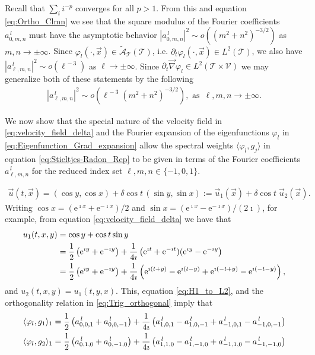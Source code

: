 \documentclass[11pt]{amsart}
\newcommand{\e}{\mathrm{e}}
\newcommand{\Tc}{\mathcal{T}}
\newcommand{\Vc}{\mathcal{V}}
\newcommand{\As}{\mathscr{A}}
\begin{document}
Recall that $\sum_ii^{-p}$ converges for all $p>1$. From this and
equation \eqref{eq:Ortho_Clmn} we see that the square modulus of the  
Fourier coefficients $a^{\,l}_{0,m,n}$ must have the asymptotic behavior 
$|a^{\,l}_{0,m,n}|^2\sim o((m^2+n^2)^{-3/2})$ as $m,n\to\pm\infty$. Since
$\varphi_l(\cdot,\vec{x})\in\tilde{\As}_{\Tc}(\Tc)$, i.e. $\partial_t\varphi_l(\cdot,\vec{x})\in L^2(\Tc)$, we also
have $|a^{\,l}_{\ell,m,n}|^2\sim o(\ell^{\,-3})$ as $\ell\to\pm\infty$. Since
$\partial_t\vec{\nabla}\varphi_l\in L^2(\Tc\times\Vc)$ we may generalize 
both of these statements by the following
%
\begin{align}\label{eq:Clmn_assymptotics}
  |a^{\,l}_{\ell,m,n}|^2\sim o(\ell^{\,-3}(m^2+n^2)^{-3/2}), \text{ as } \,\ell,m,n\to\pm\infty.
\end{align}
%





We now show that the special nature of the velocity field in
\eqref{eq:velocity_field_delta} and the Fourier expansion of the eigenfunctions $\varphi_l$ in  
\eqref{eq:Eigenfunction_Grad_expansion} allow the spectral weights
$\langle\varphi_l,g_j\rangle$ in equation \eqref{eq:Stieltjes-Radon_Rep} to be given in
terms of the Fourier coefficients $a^{\,l}_{\ell,m,n}$ for the reduced
index set $\ell,m,n\in\{-1,0,1\}$. 


%
\begin{align}\label{eq:velocity_field_delta}
\vec{u}(t,\vec{x})%
       =(\cos y,\cos x)+\delta\cos t \,(\sin y,\sin x)
       :=\vec{u}_1(\vec{x})+\delta\cos{t}\;\vec{u}_2(\vec{x}). 
\end{align}
%
Writing
$\cos{x}=(\e^{\imath x}+\e^{-\imath x})/2$ and
$\sin{x}=(\e^{\imath x}-\e^{-\imath x})/(2\imath)$, for example, from equation
\eqref{eq:velocity_field_delta} we have that 
%
\begin{align}
  u_1(t,x,y)&=\cos{y}+\cos{t}\sin{y}\\
           &=\frac{1}{2}\left(\e^{\imath y}+\e^{-\imath y}\right)
            +\frac{1}{4\imath}\left(\e^{\imath t}+\e^{-\imath t})(\e^{\imath y}-\e^{-\imath y}\right)
            \notag\\
           &=\frac{1}{2}\left(\e^{\imath y}+\e^{-\imath y}\right)
            +\frac{1}{4\imath}\left(\e^{\imath(t+y)}-\e^{\imath(t-y)}+\e^{\imath(-t+y)}-\e^{\imath(-t-y)}\right),
            \notag
\end{align}
%
and $u_2(t,x,y)=u_1(t,y,x)$. This, equation \eqref{eq:H1_to_L2}, and the
orthogonality relation in \eqref{eq:Trig_orthogonal} imply that
%
\begin{align}\label{eq:Inner_Products_2D}
  \langle\varphi_l,g_1\rangle_1=\frac{1}{2}\left(a^{\,l}_{0,0,1}+a^{\,l}_{0,0,-1}\right)
               +\frac{1}{4\imath}\left(a^{\,l}_{1,0,1}-a^{\,l}_{1,0,-1}+a^{\,l}_{-1,0,1}-a^{\,l}_{-1,0,-1}\right) 
               \\
  \langle\varphi_l,g_2\rangle_1=\frac{1}{2}\left(a^{\,l}_{0,1,0}+a^{\,l}_{0,-1,0}\right)
               +\frac{1}{4\imath}\left(a^{\,l}_{1,1,0}-a^{\,l}_{1,-1,0}+a^{\,l}_{-1,1,0}-a^{\,l}_{-1,-1,0}\right)
               \notag
\end{align}
%
\end{document}
